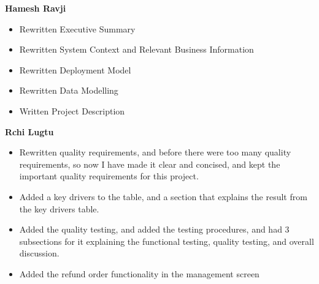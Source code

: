 \textbf{Hamesh Ravji}
\begin{itemize}
	\item Rewritten Executive Summary
	\item Rewritten System Context and Relevant Business Information
	\item Rewritten Deployment Model
	\item Rewritten Data Modelling
	\item Written Project Description
\end{itemize}

\textbf{Rchi Lugtu}
\begin{itemize}
	\item Rewritten quality requirements, and before there were too many quality requirements, so now I have made it clear and concised, and kept the important quality requirements for this project.
	\item Added a key drivers to the table, and a section that explains the result from the key drivers table.
	\item Added the quality testing, and added the testing procedures, and had 3 subsections for it explaining the functional testing, quality testing, and overall discussion.
	\item Added the refund order functionality in the management screen
\end{itemize}